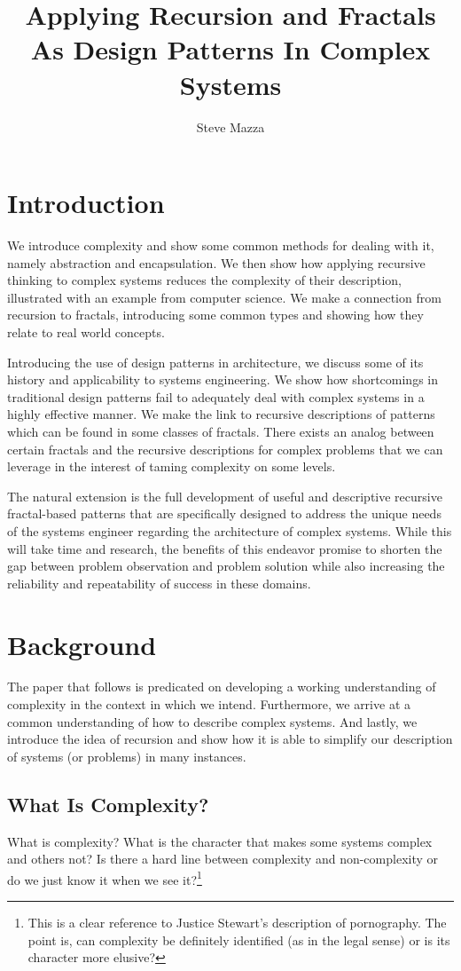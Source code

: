 \documentclass[jou,apacite]{apa6}
\title{Applying Recursion and Fractals As Design Patterns In Complex Systems}
\author{Steve Mazza}
\affiliation{Naval Postgraduate School}
\begin{document}
\maketitle    
                        
\section{Introduction}  %
We introduce complexity and show some common methods for dealing with it, namely abstraction and encapsulation.  We then show how applying recursive thinking to complex systems reduces the complexity of their description, illustrated with an example from computer science.  We make a connection from recursion to fractals, introducing some common types and showing how they relate to real world concepts.

Introducing the use of design patterns in architecture, we discuss some of its history and applicability to systems engineering.  We show how shortcomings in traditional design patterns fail to adequately deal with complex systems in a highly effective manner.  We make the link to recursive descriptions of patterns which can be found in some classes of fractals.  There exists an analog between certain fractals and the recursive descriptions for complex problems that we can leverage in
the interest of taming complexity on some levels.

The natural extension is the full development of useful and descriptive recursive fractal-based patterns that are specifically designed to address the unique needs of the systems engineer regarding the architecture of complex systems.  While this will take time and research, the benefits of this endeavor promise to shorten the gap between problem observation and problem solution while also increasing the reliability and repeatability of success in these domains.

\section{Background}  %
The paper that follows is predicated on developing a working understanding of complexity in the context in which we intend.  Furthermore, we arrive at a common understanding of how to describe complex systems.  And lastly, we introduce the idea of recursion and show how it is able to simplify our description of systems (or problems) in many instances.

\subsection{What Is Complexity?}  %
What is complexity?  What is the character that makes some systems complex and others not?  Is there a hard line between complexity and non-complexity or do we just know it when we see it?\footnote{This is a clear reference to Justice Stewart's description of pornography.  The point is, can complexity be definitely identified (as in the legal sense) or is its character more elusive?}
\end{document}

